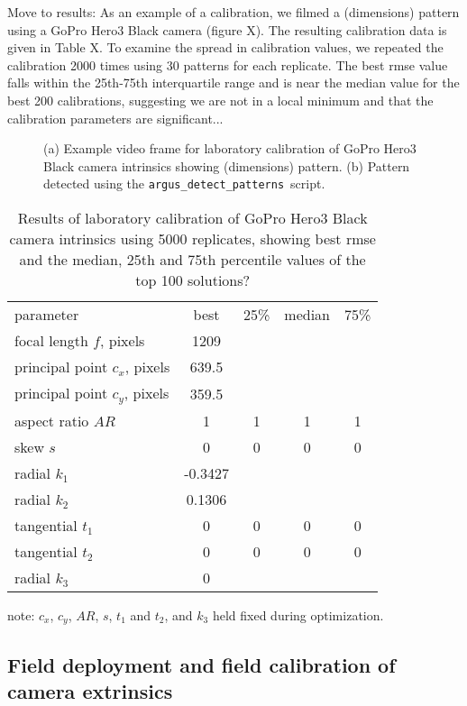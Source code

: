 \documentclass[fleqn,10pt]{wlpeerj}
\newcommand{\detectpatterns}{\texttt{argus\_detect\_patterns}}
\begin{document}
Move to results: As an example of a calibration, we filmed a (dimensions) pattern using a GoPro Hero3 Black camera (figure X).  The resulting calibration data is given in Table X. To examine the spread in calibration values, we repeated the calibration 2000 times using 30 patterns for each replicate. The best rmse value falls within the 25th-75th interquartile range and is near the median value for the best 200 calibrations, suggesting we are not in a local minimum and that the calibration parameters are significant...   

\begin{figure}
\caption{(a) Example video frame for laboratory calibration of GoPro Hero3 Black camera intrinsics showing (dimensions) pattern.  (b) Pattern detected using the \detectpatterns\ script.}
\label{fig:labcal1}
\end{figure}

\begin{table}
\caption{Results of laboratory calibration of GoPro Hero3 Black camera intrinsics using 5000 replicates, showing best rmse and the median, 25th and 75th percentile values of the top 100 solutions? }
\label{tab:labcal2}
\begin{center}
\begin{tabular}{lcccc}
parameter & best & 25\% & median & 75\% \\
\cline{1-5}
focal length $f$, pixels & 1209 & & &\\
principal point $c_x$, pixels & 639.5 & & & \\
principal point $c_y$, pixels & 359.5 & & & \\
aspect ratio $AR$ & 1 & 1 & 1 & 1\\
skew $s$ & 0 & 0 & 0 & 0 \\
radial $k_1$ & -0.3427 & & & \\
radial $k_2$ & 0.1306 & & & \\
tangential $t_1$ & 0 & 0 & 0 & 0 \\
tangential $t_2$ & 0 & 0 & 0 & 0 \\
radial $k_3$ & 0 & & & \\
\end{tabular}
\end{center}
note: $c_x$, $c_y$, $AR$, $s$, $t_1$ and $t_2$, and $k_3$ held fixed during optimization.
\end{table}


\subsection*{Field deployment and field calibration of camera extrinsics}
\end{document}
